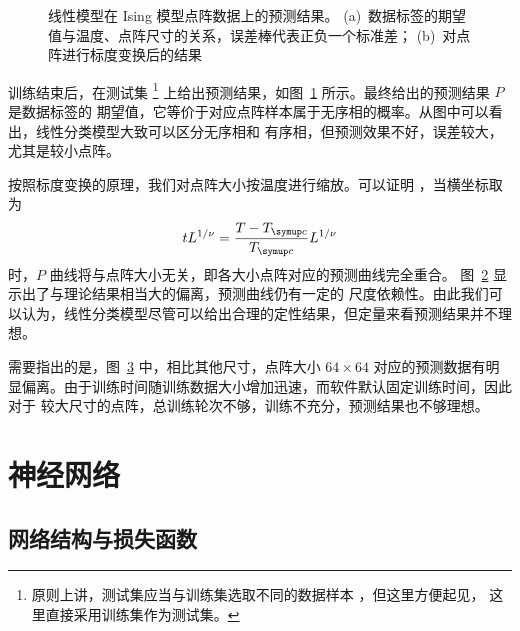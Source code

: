 \begin{figure}[htb]
  \centering
  \begin{subfigure}[b]{0.47\textwidth}
    \centering
    \label{fig:ising-learning-linear}
  \end{subfigure}
  \begin{subfigure}[b]{0.47\textwidth}
    \centering
    \label{fig:ising-learning-linear-scaled}
  \end{subfigure}
  \caption{线性模型在 Ising 模型点阵数据上的预测结果。
    (a)~数据标签的期望值与温度、点阵尺寸的关系，误差棒代表正负一个标准差；
    (b)~对点阵进行标度变换后的结果}
  \label{fig:ising-learning-linear-total}
\end{figure}

训练结束后，在测试集
\footnote{原则上讲，测试集应当与训练集选取不同的数据样本 \cite{zhouzhihua}，但这里方便起见，
  这里直接采用训练集作为测试集。}
上给出预测结果，如图~\ref{fig:ising-learning-linear} 所示。最终给出的预测结果 $P$ 是数据标签的
期望值，它等价于对应点阵样本属于无序相的概率。从图中可以看出，线性分类模型大致可以区分无序相和
有序相，但预测效果不好，误差较大，尤其是较小点阵。

按照标度变换的原理，我们对点阵大小按温度进行缩放。可以证明 \cite{phase}，当横坐标取为
\begin{equation}
  tL^{1/\nu} = \frac{T-\Tc}{\Tc} L^{1/\nu}
\end{equation}
时，$P$ 曲线将与点阵大小无关，即各大小点阵对应的预测曲线完全重合。
图~\ref{fig:ising-learning-linear-scaled} 显示出了与理论结果相当大的偏离，预测曲线仍有一定的
尺度依赖性。由此我们可以认为，线性分类模型尽管可以给出合理的定性结果，但定量来看预测结果并不理想。

需要指出的是，图~\ref{fig:ising-learning-linear-total} 中，相比其他尺寸，点阵大小 $64 \times 64$
对应的预测数据有明显偏离。由于训练时间随训练数据大小增加迅速，而软件默认固定训练时间，因此对于
较大尺寸的点阵，总训练轮次不够，训练不充分，预测结果也不够理想。

\section{神经网络}

\subsection{网络结构与损失函数}

